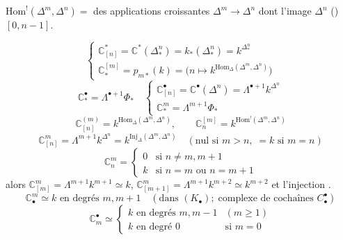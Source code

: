 \documentclass[11pt,a4paper]{article}
\begin{document}

$\mathrm{Hom}^!(\Delta^m,\Delta^n) =$  des applications croissantes $\Delta^m \to \Delta^n$ \struck{$[0,n]$} dont l'image  \ill{} $\Delta^n$ (\ill{})  $[0,n-1]$.

\[
\begin{cases}
\mathbb{C}^*_{[n]} = \mathbb{C}^*(\Delta^n_*) = k_*(\Delta^n_*) = k^{\Delta^n_*} \\
\mathbb{C}^{[m]}_* = p_{m*}(k) = \bigl(n\mapsto k^{\mathrm{Hom}_\Delta(\Delta^m,\Delta^n)}\bigr)
\end{cases}
\]
\[
\mathbb{C}^\bullet_* = \Lambda^{\bullet+1}\Phi_* \quad
\begin{cases}
\mathbb{C}^\bullet_{[n]} = \mathbb{C}^\bullet(\Delta^n) = \Lambda^{\bullet+1}k^{\Delta^n} \\
\mathbb{C}^m_* = \Lambda^{m+1}\Phi_*
\end{cases}
\]
\[
\mathbb{C}^{(m)}_{[n]} = k^{\mathrm{Hom}_\Delta(\Delta^m,\Delta^n)}, \qquad
\mathbb{C}^{[m]}_n = k^{\mathrm{Hom}^!(\Delta^m,\Delta^n)}
\]
\[
\mathbb{C}^m_{[n]} = \Lambda^{m+1}k^{\Delta^n} = k^{\mathrm{Inj}_\Delta(\Delta^m,\Delta^n)}
\quad (\text{nul si } m>n,\; = k \text{ si } m=n)
\]
\[
\mathbb{C}^m_n = \begin{cases} 0 & \text{si } n\neq m, m+1 \\ k & \text{si } n = m \text{ ou } n = m+1 \end{cases}
\]
alors $\mathbb{C}^m_{[m]} = \Lambda^{m+1}k^{m+1} \simeq k$, \; $\mathbb{C}^m_{[m+1]} = \Lambda^{m+1}k^{m+2} \simeq k^{m+2}$ et \ill{} l'injection  \ill{}.
\[
\mathbb{C}^m_\bullet \simeq k \text{ en degrés } m, m+1 \quad (\text{dans } (K_\bullet) ;\; \text{complexe de cochaînes } C^\bullet_\bullet)
\]
\[
\mathbb{C}^\bullet_m \simeq \begin{cases} k \text{ en degrés } m, m-1 & (m\ge1) \\ k \text{ en degré } 0 & \text{si } m = 0 \end{cases}
\]
\end{document}
